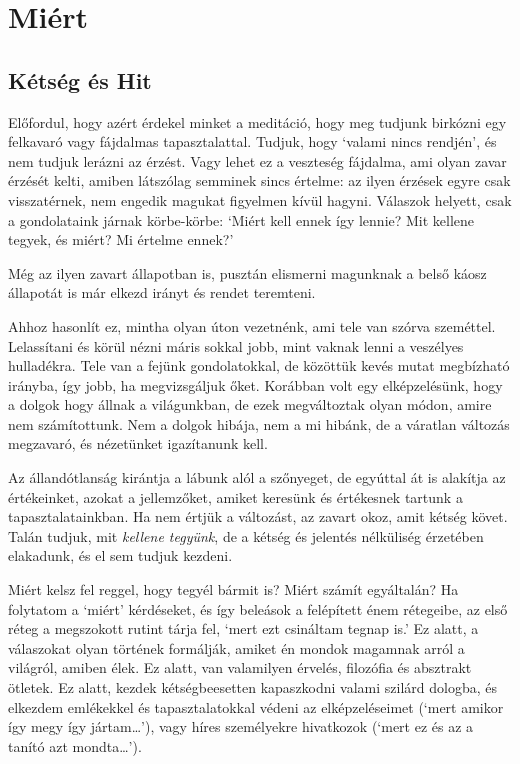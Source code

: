 \chapter{Miért}

\section{Kétség és Hit}


\noindent Előfordul, hogy azért érdekel minket a meditáció, hogy meg
tudjunk birkózni egy felkavaró vagy fájdalmas tapasztalattal. Tudjuk,
hogy `valami nincs rendjén', és nem tudjuk lerázni az érzést. Vagy lehet
ez a veszteség fájdalma, ami olyan zavar érzését kelti, amiben látszólag
semminek sincs értelme: az ilyen érzések egyre csak visszatérnek, nem
engedik magukat figyelmen kívül hagyni. Válaszok helyett, csak a
gondolataink járnak körbe-körbe: `Miért kell ennek így lennie? Mit
kellene tegyek, és miért? Mi értelme ennek?'

Még az ilyen zavart állapotban is, pusztán elismerni magunknak a belső
káosz állapotát is már elkezd irányt és rendet teremteni.

Ahhoz hasonlít ez, mintha olyan úton vezetnénk, ami tele van szórva
szeméttel. Lelassítani és körül nézni máris sokkal jobb, mint vaknak
lenni a veszélyes hulladékra. Tele van a fejünk gondolatokkal, de
közöttük kevés mutat megbízható irányba, így jobb, ha megvizsgáljuk
őket. Korábban volt egy elképzelésünk, hogy a dolgok hogy állnak a
világunkban, de ezek megváltoztak olyan módon, amire nem számítottunk.
Nem a dolgok hibája, nem a mi hibánk, de a váratlan változás megzavaró,
és nézetünket igazítanunk kell.

Az állandótlanság kirántja a lábunk alól a szőnyeget, de egyúttal át is
alakítja az értékeinket, azokat a jellemzőket, amiket keresünk és
értékesnek tartunk a tapasztalatainkban. Ha nem értjük a változást, az
zavart okoz, amit kétség követ. Talán tudjuk, mit \emph{kellene
tegyünk}, de a kétség és jelentés nélküliség érzetében elakadunk, és el
sem tudjuk kezdeni.


Miért kelsz fel reggel, hogy tegyél bármit is? Miért számít egyáltalán?
Ha folytatom a `miért' kérdéseket, és így beleások a felépített énem
rétegeibe, az első réteg a megszokott rutint tárja fel, `mert ezt
csináltam tegnap is.' Ez alatt, a válaszokat olyan történek formálják,
amiket én mondok magamnak arról a világról, amiben élek. Ez alatt, van
valamilyen érvelés, filozófia és absztrakt ötletek. Ez alatt, kezdek
kétségbeesetten kapaszkodni valami szilárd dologba, és elkezdem
emlékekkel és tapasztalatokkal védeni az elképzeléseimet (`mert amikor
így megy így jártam\ldots{}'), vagy híres személyekre hivatkozok (`mert
ez és az a tanító azt mondta\ldots{}').

